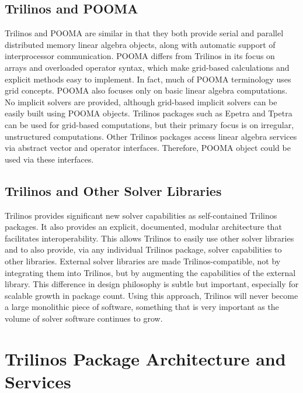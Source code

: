 \documentclass[acmtoms,acmnow]{acmtrans2m}
\begin{document}
\subsection{Trilinos and POOMA}

Trilinos and POOMA are similar in that they both provide serial and parallel
distributed memory linear algebra objects, along with automatic support of
interprocessor communication.   POOMA differs from Trilinos in its
focus on arrays and overloaded operator syntax, which make
grid-based calculations and explicit methods easy to implement.  In
fact, much of POOMA terminology uses grid concepts.  POOMA also focuses
only on basic linear algebra computations.  No implicit solvers are
provided, although grid-based implicit solvers can be easily built
using POOMA objects.
Trilinos packages such as Epetra and Tpetra can be used for grid-based
computations, but their primary focus is on
irregular, unstructured computations.  Other Trilinos packages access
linear algebra services via abstract vector and operator interfaces.
Therefore, POOMA object could be used via these interfaces. 

\subsection{Trilinos and Other Solver Libraries}
Trilinos provides significant new solver capabilities as 
self-contained Trilinos packages.  It also provides an explicit,
documented, modular architecture that 
facilitates interoperability.  This allows Trilinos to easily use
other solver libraries and to also provide, via any individual Trilinos
package, solver capabilities to other libraries. External solver
libraries are made Trilinos-compatible, not by integrating them into
Trilinos, but by augmenting the capabilities of the external library.
This difference in design philosophy is subtle but important,
especially for scalable growth in package count.  Using this approach,
Trilinos will never become a large monolithic piece of software,
something that is very important as the volume of solver software
continues to grow.

\section{Trilinos Package Architecture and Services}
\label{sect:TrilinosServices}
\end{document}
